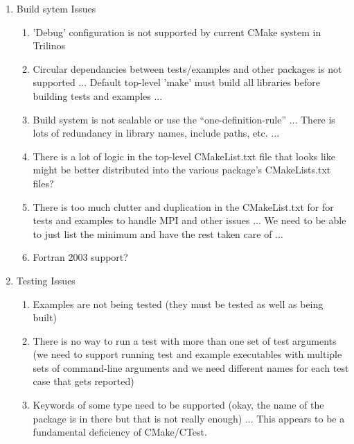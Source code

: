 \documentclass[pdf,ps2pdf,11pt]{SANDreport}
\begin{document}
\begin{enumerate}

{}\item Build sytem Issues

  \begin{enumerate}

  {}\item 'Debug' configuration is not supported by current CMake
  system in Trilinos

  {}\item Circular dependancies between tests/examples and other
  packages is not supported ... Default top-level 'make' must build
  all libraries before building tests and examples ...

  {}\item Build system is not scalable or use the
  ``one-definition-rule'' ... There is lots of redundancy in library
  names, include paths, etc. ...

  {}\item There is a lot of logic in the top-level CMakeList.txt file
  that looks like might be better distributed into the various
  package's CMakeLists.txt files?

  {}\item There is too much clutter and duplication in the
  CMakeList.txt for for tests and examples to handle MPI and other
  issues ... We need to be able to just list the minimum and have the
  rest taken care of ...

  {}\item Fortran 2003 support?

  \end{enumerate}

{}\item Testing Issues

  \begin{enumerate}

  {}\item Examples are not being tested (they must be tested as well
  as being built)

  {}\item There is no way to run a test with more than one set of test
  arguments (we need to support running test and example executables
  with multiple sets of command-line arguments and we need different
  names for each test case that gets reported)

  {}\item Keywords of some type need to be supported (okay, the name
  of the package is in there but that is not really enough) ... This
  appears to be a fundamental deficiency of CMake/CTest.

  \end{enumerate}

\end{enumerate}
\end{document}
